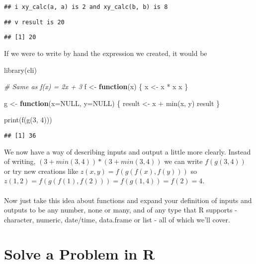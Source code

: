 \documentclass[
]{book}
\newenvironment{Shaded}{\begin{snugshade}}{\end{snugshade}}
\newcommand{\AttributeTok}[1]{\textcolor[rgb]{0.77,0.63,0.00}{#1}}
\newcommand{\CommentTok}[1]{\textcolor[rgb]{0.56,0.35,0.01}{\textit{#1}}}
\newcommand{\ConstantTok}[1]{\textcolor[rgb]{0.00,0.00,0.00}{#1}}
\newcommand{\ControlFlowTok}[1]{\textcolor[rgb]{0.13,0.29,0.53}{\textbf{#1}}}
\newcommand{\DecValTok}[1]{\textcolor[rgb]{0.00,0.00,0.81}{#1}}
\newcommand{\FunctionTok}[1]{\textcolor[rgb]{0.00,0.00,0.00}{#1}}
\newcommand{\NormalTok}[1]{#1}
\newcommand{\OtherTok}[1]{\textcolor[rgb]{0.56,0.35,0.01}{#1}}
\newcommand{\SpecialCharTok}[1]{\textcolor[rgb]{0.00,0.00,0.00}{#1}}
\begin{document}
\begin{verbatim}
## i xy_calc(a, a) is 2 and xy_calc(b, b) is 8
\end{verbatim}

\begin{verbatim}
## v result is 20
\end{verbatim}

\begin{verbatim}
## [1] 20
\end{verbatim}

If we were to write by hand the expression we created, it would be

\begin{Shaded}
\begin{Highlighting}[]
\FunctionTok{library}\NormalTok{(cli)}

\CommentTok{\# Same as f(x) = 2x + 3}
\NormalTok{f }\OtherTok{\textless{}{-}}  \ControlFlowTok{function}\NormalTok{(x) \{}
\NormalTok{  x }\OtherTok{\textless{}{-}}\NormalTok{ x }\SpecialCharTok{*}\NormalTok{ x}
\NormalTok{  x}
\NormalTok{\}}

\NormalTok{g }\OtherTok{\textless{}{-}} \ControlFlowTok{function}\NormalTok{(}\AttributeTok{x=}\ConstantTok{NULL}\NormalTok{, }\AttributeTok{y=}\ConstantTok{NULL}\NormalTok{) \{}
\NormalTok{  result }\OtherTok{\textless{}{-}}\NormalTok{ x }\SpecialCharTok{+} \FunctionTok{min}\NormalTok{(x, y)}
\NormalTok{  result}
\NormalTok{\}}

\FunctionTok{print}\NormalTok{(}\FunctionTok{f}\NormalTok{(}\FunctionTok{g}\NormalTok{(}\DecValTok{3}\NormalTok{, }\DecValTok{4}\NormalTok{)))}
\end{Highlighting}
\end{Shaded}

\begin{verbatim}
## [1] 36
\end{verbatim}

We now have a way of describing inputs and output a little more clearly. Instead of writing, \((3 + min(3, 4)) * (3 + min(3, 4))\) we can write \(f(g(3, 4))\) or try new creations like \(z(x, y)=f(g(f(x), f(y)))\) so \(z(1, 2)=f(g(f(1), f(2)))=f(g(1, 4))=f(2)=4\).\\
~\\
Now just take this idea about functions and expand your definition of inputs and outputs to be any number, none or many, and of any type that R supports - character, numeric, date/time, data.frame or list - all of which we'll cover.

\hypertarget{solve-a-problem-in-r}{%
\section{Solve a Problem in R}\label{solve-a-problem-in-r}}
\end{document}
